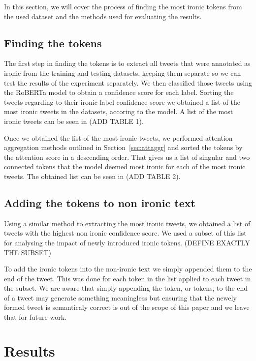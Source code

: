 \documentclass[10pt, a4paper]{article}
\begin{document}
In this section, we will cover the process of finding the most ironic tokens from the used dataset and the methods used for evaluating the results.

\subsection{Finding the tokens}

The first step in finding the tokens is to extract all tweets that were annotated as ironic from the training and testing datasets, keeping them separate so we can test the results of the experiment separately.
We then classified those tweets using the RoBERTa model to obtain a confidence score for each label.
Sorting the tweets regarding to their ironic label confidence score we obtained a list of the most ironic tweets in the datasets, accoring to the model.
A list of the most ironic tweets can be seen in (ADD TABLE 1).

Once we obtained the list of the most ironic tweets, we performed attention aggregation methods outlined in Section~\ref{sec:attaggr} and sorted the tokens by the attention score in a descending order.
That gives us a list of singular and two connected tokens that the model deemed most ironic for each of the most ironic tweets. 
The obtained list can be seen in (ADD TABLE 2).

\subsection{Adding the tokens to non ironic text}

Using a similar method to extracting the most ironic tweets, we obtained a list of tweets with the highest non ironic confidence score.
We used a subset of this list for analysing the impact of newly introduced ironic tokens. (DEFINE EXACTLY THE SUBSET)

To add the ironic tokens into the non-ironic text we simply appended them to the end of the tweet. This was done for each token in the list applied to each tweet in the subset.
We are aware that simply appending the token, or tokens, to the end of a tweet may generate something meaningless but ensuring that the newely formed tweet is semanticaly correct is out of the scope of this paper and we leave that for future work.

\section{Results}
\end{document}
